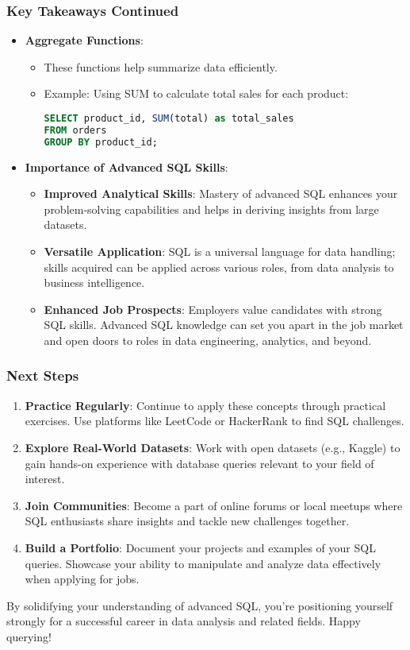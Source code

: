 \documentclass[aspectratio=169]{beamer}
\begin{document}
\begin{frame}[fragile]
    \frametitle{Key Takeaways Continued}
    \begin{itemize}
        \item \textbf{Aggregate Functions}:
        \begin{itemize}
            \item These functions help summarize data efficiently.
            \item Example: Using SUM to calculate total sales for each product:
            \begin{lstlisting}[language=SQL]
SELECT product_id, SUM(total) as total_sales 
FROM orders 
GROUP BY product_id;
            \end{lstlisting}
        \end{itemize}
        
        \item \textbf{Importance of Advanced SQL Skills}:
        \begin{itemize}
            \item \textbf{Improved Analytical Skills}: Mastery of advanced SQL enhances your problem-solving capabilities and helps in deriving insights from large datasets.
            \item \textbf{Versatile Application}: SQL is a universal language for data handling; skills acquired can be applied across various roles, from data analysis to business intelligence.
            \item \textbf{Enhanced Job Prospects}: Employers value candidates with strong SQL skills. Advanced SQL knowledge can set you apart in the job market and open doors to roles in data engineering, analytics, and beyond.
        \end{itemize}
    \end{itemize}
\end{frame}

\begin{frame}[fragile]
    \frametitle{Next Steps}
    \begin{enumerate}
        \item \textbf{Practice Regularly}: Continue to apply these concepts through practical exercises. Use platforms like LeetCode or HackerRank to find SQL challenges.
        \item \textbf{Explore Real-World Datasets}: Work with open datasets (e.g., Kaggle) to gain hands-on experience with database queries relevant to your field of interest.
        \item \textbf{Join Communities}: Become a part of online forums or local meetups where SQL enthusiasts share insights and tackle new challenges together.
        \item \textbf{Build a Portfolio}: Document your projects and examples of your SQL queries. Showcase your ability to manipulate and analyze data effectively when applying for jobs.
    \end{enumerate}
    
    By solidifying your understanding of advanced SQL, you're positioning yourself strongly for a successful career in data analysis and related fields. Happy querying!
\end{frame}
\end{document}
